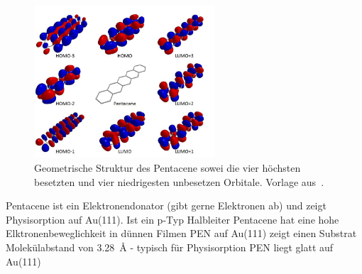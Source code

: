             \begin{figure}
                \centering
                \includegraphics[width=0.6\textwidth]{./content/pictures/PEN.jpg}
                \caption{Geometrische Struktur des Pentacene sowei die vier höchsten besetzten und vier niedrigesten unbesetzen Orbitale. Vorlage aus~\cite{PEN}.}
                \label{fig:PEN}
            \end{figure}

            \textbf{\cite{5A_1}}
            Pentacene ist ein Elektronendonator (gibt gerne Elektronen ab) und zeigt Physisorption auf Au(111).
            Ist ein p-Typ Halbleiter
            Pentacene hat eine hohe Elktronenbeweglichkeit in dünnen Filmen
            PEN auf Au(111) zeigt einen Substrat Molekülabstand von \SI{3.28}{\angstrom} - typisch für Physisorption
            PEN liegt glatt auf Au(111)
    